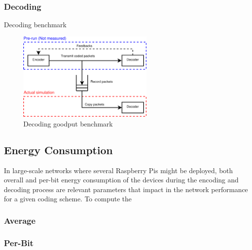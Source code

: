 \subsubsection{Decoding}
Decoding benchmark

\begin{figure}[ht!]
\centering
\includegraphics[width=0.6\textwidth]{images/measure_decoder.pdf}
\caption{Decoding goodput benchmark}
\label{fig:dec_goodput_benchmark}
\end{figure}

\subsection{Energy Consumption}
In large-scale networks where several Raspberry Pis might be deployed,
both overall and per-bit energy consumption of the devices during the
encoding and decoding process are relevant parameters that impact in the
network performance for a given coding scheme. To compute the

\subsubsection{Average}
\subsubsection{Per-Bit}